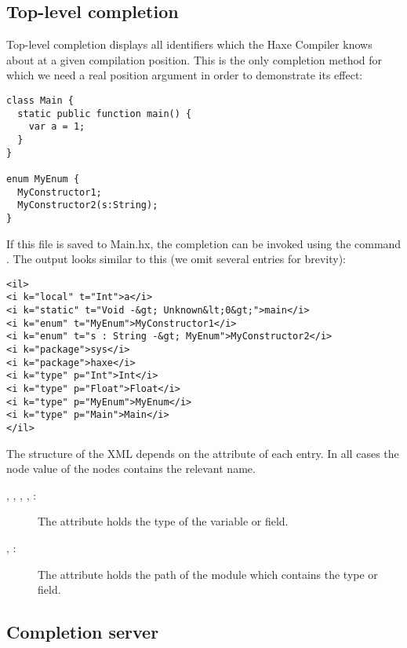 \subsection{Top-level completion}
\label{cr-completion-top-level}

Top-level completion displays all identifiers which the Haxe Compiler knows about at a given compilation position. This is the only completion method for which we need a real position argument in order to demonstrate its effect:

\begin{lstlisting}
class Main {
  static public function main() {
    var a = 1;
  }
}

enum MyEnum {
  MyConstructor1;
  MyConstructor2(s:String);
}
\end{lstlisting}

If this file is saved to Main.hx, the completion can be invoked using the command . The output looks similar to this (we omit several entries for brevity):

\begin{lstlisting}
<il>
<i k="local" t="Int">a</i>
<i k="static" t="Void -&gt; Unknown&lt;0&gt;">main</i>
<i k="enum" t="MyEnum">MyConstructor1</i>
<i k="enum" t="s : String -&gt; MyEnum">MyConstructor2</i>
<i k="package">sys</i>
<i k="package">haxe</i>
<i k="type" p="Int">Int</i>
<i k="type" p="Float">Float</i>
<i k="type" p="MyEnum">MyEnum</i>
<i k="type" p="Main">Main</i>
</il>
\end{lstlisting}

The structure of the XML depends on the  attribute of each entry. In all cases the node value of the  nodes contains the relevant name.

\begin{description}
	\item[, , , , :] The  attribute holds the type of the variable or field.
	\item[, :] The  attribute holds the path of the module which contains the type or field.
\end{description}



\subsection{Completion server}
\label{cr-completion-server}

